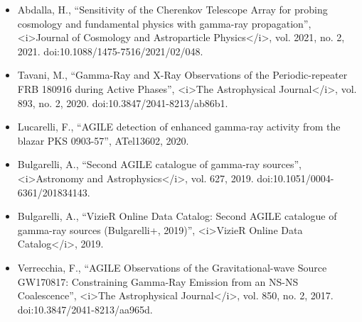 \begin{itemize}
\item Abdalla, H., “Sensitivity of the Cherenkov Telescope Array for probing cosmology and fundamental physics with gamma-ray propagation”, <i>Journal of Cosmology and Astroparticle Physics</i>, vol. 2021, no. 2, 2021. doi:10.1088/1475-7516/2021/02/048.
\item Tavani, M., “Gamma-Ray and X-Ray Observations of the Periodic-repeater FRB 180916 during Active Phases”, <i>The Astrophysical Journal</i>, vol. 893, no. 2, 2020. doi:10.3847/2041-8213/ab86b1.
\item Lucarelli, F., “AGILE detection of enhanced gamma-ray activity from the blazar PKS 0903-57”, ATel13602, 2020.
\item Bulgarelli, A., “Second AGILE catalogue of gamma-ray sources”, <i>Astronomy and Astrophysics</i>, vol. 627, 2019. doi:10.1051/0004-6361/201834143.
\item Bulgarelli, A., “VizieR Online Data Catalog: Second AGILE catalogue of gamma-ray sources (Bulgarelli+, 2019)”, <i>VizieR Online Data Catalog</i>, 2019.
\item Verrecchia, F., “AGILE Observations of the Gravitational-wave Source GW170817: Constraining Gamma-Ray Emission from an NS-NS Coalescence”, <i>The Astrophysical Journal</i>, vol. 850, no. 2, 2017. doi:10.3847/2041-8213/aa965d.


  
\end{itemize}
